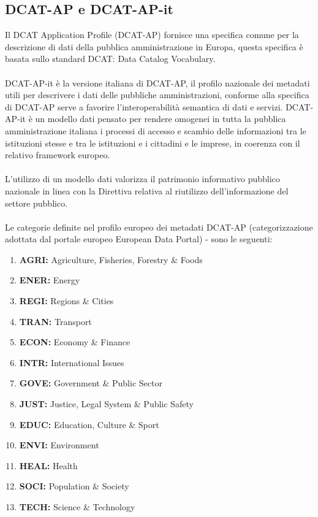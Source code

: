 \documentclass{article}
\theoremstyle{plain}
\theoremstyle{definition}
\begin{document}
\newpage
\subsection{DCAT-AP e DCAT-AP-it}
Il DCAT Application Profile (DCAT-AP) fornisce una specifica comune per la descrizione di dati della pubblica amministrazione in Europa, questa specifica è basata sullo standard DCAT: Data Catalog Vocabulary. \footnotemark
{}
\\
\\
DCAT-AP-it è la versione italiana di DCAT-AP, il profilo nazionale dei metadati utili per descrivere i dati delle pubbliche amministrazioni, conforme alla specifica di DCAT-AP serve a favorire l'interoperabilità semantica di dati e servizi. DCAT-AP-it è un modello dati pensato per rendere omogenei in tutta la pubblica amministrazione italiana i processi di accesso e scambio delle informazioni tra le istituzioni stesse e tra le istituzioni e i cittadini e le imprese, in coerenza con il relativo framework europeo. 
\\
\\
L'utilizzo di un modello dati valorizza il patrimonio informativo pubblico nazionale in linea con la Direttiva relativa al riutilizzo dell'informazione del settore pubblico.
\\
\\
Le categorie definite nel profilo europeo dei metadati DCAT-AP (categorizzazione adottata dal portale europeo European Data Portal) - sono le seguenti:

\begin{enumerate}
\item \textbf{AGRI:} Agriculture, Fisheries, Forestry \& Foods
\item \textbf{ENER:} Energy
\item \textbf{REGI:} Regions \& Cities
\item \textbf{TRAN:} Transport
\item \textbf{ECON:} Economy \& Finance
\item \textbf{INTR:} International Issues
\item \textbf{GOVE:} Government \& Public Sector
\item \textbf{JUST:} Justice, Legal System \& Public Safety
\item \textbf{EDUC:} Education, Culture \& Sport
\item \textbf{ENVI:} Environment
\item \textbf{HEAL:} Health
\item \textbf{SOCI:} Population \& Society
\item \textbf{TECH:} Science \& Technology
\end{enumerate}
\end{document}
